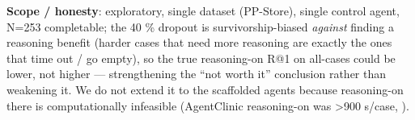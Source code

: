 \textbf{Scope / honesty}: exploratory, single dataset (PP-Store), single control agent,
N=253 completable; the 40 \% dropout is survivorship-biased \emph{against} finding a
reasoning benefit (harder cases that need more reasoning are exactly the ones that
time out / go empty), so the true reasoning-on R@1 on all-cases could be lower, not
higher --- strengthening the ``not worth it'' conclusion rather than weakening it. We
do not extend it to the scaffolded agents because reasoning-on there is
computationally infeasible (AgentClinic reasoning-on was \textgreater900 s/case, ).


